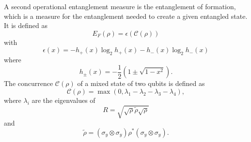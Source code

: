 \documentclass[8pt]{article}
\begin{document}
A second operational entanglement measure is the entanglement of formation, which is a measure for the entanglement needed to create a given entangled state\autocite{Wootters1998}.
It is defined as
\begin{equation}
E_F(\rho) = \epsilon(\mathcal{C}(\rho))
\end{equation}
with
\begin{equation}
\epsilon(x) = -h_+(x) \log_2 h_+(x) - h_-(x)\log_2 h_-(x)
\end{equation}
where
\begin{equation}
h_{\pm}(x) = -\frac{1}{2} \left(1\pm \sqrt{1-x^2} \right).
\end{equation}
The concurrence $\mathcal{C}(\rho)$ of a mixed state of two qubits is defined as
\begin{equation}
\mathcal{C}(\rho) = \max \left(0,\lambda_1-\lambda_2-\lambda_3-\lambda_4\right),
\end{equation}
where $\lambda_i$ are the eigenvalues of
\begin{equation}
R = \sqrt{\sqrt{\rho}\tilde{\rho}\sqrt{\rho}}
\end{equation}
and
\begin{equation}
\tilde{\rho} = (\sigma_{y}\otimes\sigma_{y})\rho^{*}(\sigma_{y}\otimes\sigma_{y}).
\end{equation}
\renewcommand*{\bibfont}{\scriptsize}
\printbibliography

\clearpage
%
\clearpage
%
\end{document}

